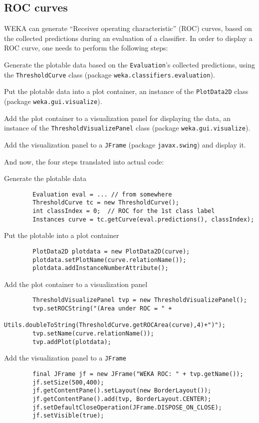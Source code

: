 \subsection{ROC curves}
WEKA can generate ``Receiver operating characteristic'' (ROC) curves, based on
the collected predictions during an evaluation of a classifier. In order to
display a ROC curve, one needs to perform the following steps:
\begin{tight_enumerate}
	\item Generate the plotable data based on the \texttt{Evaluation}'s
collected predictions, using the \texttt{ThresholdCurve} class (package
\texttt{weka.classifiers.evaluation}).
	\item Put the plotable data into a plot container, an instance of the
\texttt{PlotData2D} class (package \texttt{weka.gui.visualize}).
	\item Add the plot container to a visualization panel for displaying the
data, an instance of the \texttt{ThresholdVisualizePanel} class (package
\texttt{weka.gui.visualize}).
	\item Add the visualization panel to a \texttt{JFrame} (package
\texttt{javax.swing}) and display it.
\end{tight_enumerate}
And now, the four steps translated into actual code:
\begin{tight_enumerate}
	\item Generate the plotable data
	\begin{verbatim}
		Evaluation eval = ... // from somewhere
		ThresholdCurve tc = new ThresholdCurve();
		int classIndex = 0;  // ROC for the 1st class label
		Instances curve = tc.getCurve(eval.predictions(), classIndex);
	\end{verbatim}

	\item Put the plotable into a plot container
	\begin{verbatim}
		PlotData2D plotdata = new PlotData2D(curve);
		plotdata.setPlotName(curve.relationName());
		plotdata.addInstanceNumberAttribute();
	\end{verbatim}

	\item Add the plot container to a visualization panel
	\begin{verbatim}
		ThresholdVisualizePanel tvp = new ThresholdVisualizePanel();
		tvp.setROCString("(Area under ROC = " +
		  Utils.doubleToString(ThresholdCurve.getROCArea(curve),4)+")");
		tvp.setName(curve.relationName());
		tvp.addPlot(plotdata);
	\end{verbatim}

	\item Add the visualization panel to a \texttt{JFrame}
	\begin{verbatim}
		final JFrame jf = new JFrame("WEKA ROC: " + tvp.getName());
		jf.setSize(500,400);
		jf.getContentPane().setLayout(new BorderLayout());
		jf.getContentPane().add(tvp, BorderLayout.CENTER);
		jf.setDefaultCloseOperation(JFrame.DISPOSE_ON_CLOSE);
		jf.setVisible(true);
	\end{verbatim}
\end{tight_enumerate}

